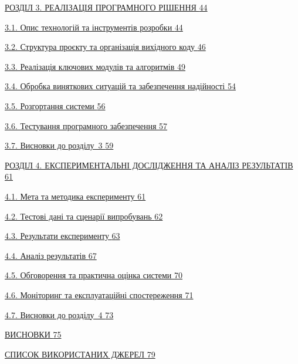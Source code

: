 \documentclass[
]{article}
\begin{document}
\hyperref[_Toc229681122]{РОЗДІЛ 3. РЕАЛІЗАЦІЯ ПРОГРАМНОГО РІШЕННЯ
\hyperref[_Toc229681122]{44}}

\hyperref[_Toc229681123]{3.1. Опис технологій та інструментів розробки
\hyperref[_Toc229681123]{44}}

\hyperref[_Toc229681128]{3.2. Структура проєкту та організація вихідного
коду \hyperref[_Toc229681128]{46}}

\hyperref[_Toc229681134]{3.3. Реалізація ключових модулів та алгоритмів
\hyperref[_Toc229681134]{49}}

\hyperref[_Toc229681146]{3.4. Обробка виняткових ситуацій та
забезпечення надійності \hyperref[_Toc229681146]{54}}

\hyperref[_Toc229681152]{3.5. Розгортання системи
\hyperref[_Toc229681152]{56}}

\hyperref[_Toc229681157]{3.6. Тестування програмного забезпечення
\hyperref[_Toc229681157]{57}}

\hyperref[_Toc229681163]{3.7. Висновки до розділу~3
\hyperref[_Toc229681163]{59}}

\hyperref[_Toc229681164]{РОЗДІЛ 4. ЕКСПЕРИМЕНТАЛЬНІ ДОСЛІДЖЕННЯ ТА
АНАЛІЗ РЕЗУЛЬТАТІВ \hyperref[_Toc229681164]{61}}

\hyperref[_Toc229681165]{4.1. Мета та методика експерименту
\hyperref[_Toc229681165]{61}}

\hyperref[_Toc229681166]{4.2. Тестові дані та сценарії випробувань
\hyperref[_Toc229681166]{62}}

\hyperref[_Toc229681167]{4.3. Результати експерименту
\hyperref[_Toc229681167]{63}}

\hyperref[_Toc229681174]{4.4. Аналіз результатів
\hyperref[_Toc229681174]{67}}

\hyperref[_Toc230379735]{4.5. Обговорення та практична оцінка системи
\hyperref[_Toc230379735]{70}}

\hyperref[Xddcc2d41e218d4eab0104affeeaeb116ef3d72e]{4.6. Моніторинг та
експлуатаційні спостереження
\hyperref[Xddcc2d41e218d4eab0104affeeaeb116ef3d72e]{71}}

\hyperref[ux432ux438ux441ux43dux43eux432ux43aux438-ux434ux43e-ux440ux43eux437ux434ux456ux43bux443-4]{4.7.
Висновки до розділу~4
\hyperref[ux432ux438ux441ux43dux43eux432ux43aux438-ux434ux43e-ux440ux43eux437ux434ux456ux43bux443-4]{73}}

\hyperref[_Toc230379738]{ВИСНОВКИ \hyperref[_Toc230379738]{75}}

\hyperref[_Toc228305380]{СПИСОК ВИКОРИСТАНИХ ДЖЕРЕЛ
\hyperref[_Toc228305380]{79}}
\end{document}

